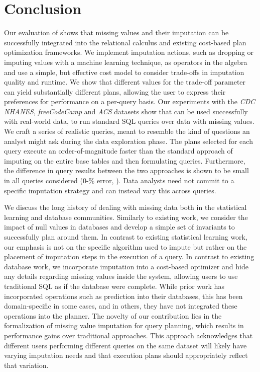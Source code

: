 \section{Conclusion}
Our evaluation of \ProjectName{} shows that missing values and their imputation can be successfully integrated into the relational calculus and
existing cost-based plan optimization frameworks. We implement imputation actions, such as dropping or imputing values with a machine
learning technique, as operators in the algebra and use a simple, but effective cost model to consider trade-offs in 
imputation quality and runtime. We show that different values for the trade-off parameter can yield substantially
different plans, allowing the user to express their preferences for performance on a per-query basis.
Our experiments with the \textit{CDC NHANES}, \textit{freeCodeCamp} and \textit{ACS} datasets
show that \ProjectName{} can be used successfully with real-world data, to run standard SQL queries over data with missing values. 
We craft a series of realistic queries, meant to resemble the kind of questions an analyst might ask during
the data exploration phase. The plans selected for each query execute an order-of-magnitude faster than
 the standard approach of imputing on the entire base tables and
then formulating queries. Furthermore, the difference in query results between the two approaches is
shown to be small in all queries considered (0-\highsmapealphaoneexacs\% error, ). Data analysts need not commit to a specific imputation strategy and can instead
vary this across queries.

We discuss the long history of dealing with missing data both in the statistical learning and database communities.
Similarly to existing work, we consider the impact of null values in databases and develop a simple set of invariants to 
successfully plan around them. In contrast to existing statistical learning work, our emphasis is not on the specific algorithm
used to impute but rather on the placement of imputation steps in the execution of a query. In contrast to existing database work,
we incorporate imputation into a cost-based optimizer and hide any details
regarding missing values inside the system, allowing users to use traditional SQL as if the database were complete.
While prior work has incorporated operations such as prediction into their databases, this has been domain-specific
in some cases, and in others, they have not integrated these operations into the planner. The novelty
of our contribution lies in the formalization of missing value imputation for query planning, which results in performance
gains over traditional approaches. This approach acknowledges that different users performing different queries on the same
dataset will likely have varying imputation needs and that execution plans should appropriately reflect that variation.

